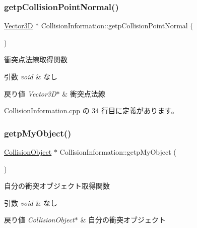 \subsubsection{\texorpdfstring{getp\+Collision\+Point\+Normal()}{getpCollisionPointNormal()}}
{\footnotesize\ttfamily \mbox{\hyperlink{class_vector3_d}{Vector3D}} $\ast$ Collision\+Information\+::getp\+Collision\+Point\+Normal (\begin{DoxyParamCaption}{ }\end{DoxyParamCaption})}



衝突点法線取得関数 


\begin{DoxyParams}{引数}
{\em void} & なし \\
\hline
\end{DoxyParams}

\begin{DoxyRetVals}{戻り値}
{\em Vector3\+D$\ast$} & 衝突点法線 \\
\hline
\end{DoxyRetVals}


 Collision\+Information.\+cpp の 34 行目に定義があります。

\mbox{\label{class_collision_information_a53fef8b0eee1d30e6a46b6f1d7c59369}} 
\subsubsection{\texorpdfstring{getp\+My\+Object()}{getpMyObject()}}
{\footnotesize\ttfamily \mbox{\hyperlink{class_collision_object}{Collision\+Object}} $\ast$ Collision\+Information\+::getp\+My\+Object (\begin{DoxyParamCaption}{ }\end{DoxyParamCaption})}



自分の衝突オブジェクト取得関数 


\begin{DoxyParams}{引数}
{\em void} & なし \\
\hline
\end{DoxyParams}

\begin{DoxyRetVals}{戻り値}
{\em Collision\+Object$\ast$} & 自分の衝突オブジェクト \\
\hline
\end{DoxyRetVals}


